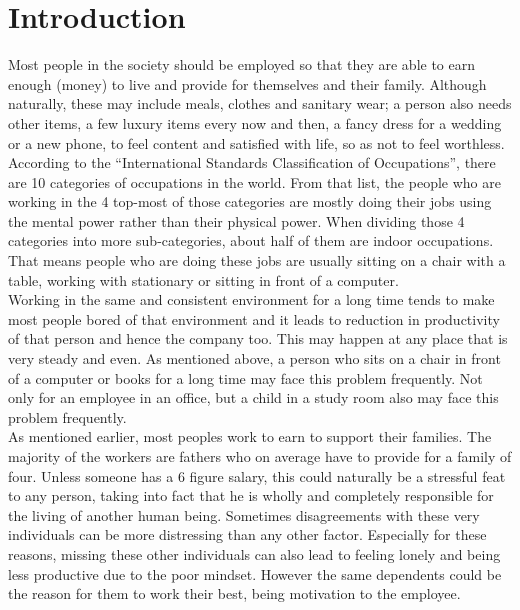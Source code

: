 \documentclass{article}
\begin{document}
	
	
	\tableofcontents
	\newpage

	\section{Introduction}
	Most people in the society should be employed so that they are able to earn enough (money) to live and provide for themselves and their family. Although naturally, these may include meals, clothes and sanitary wear; a person also needs other items, a few luxury items every now and then, a fancy dress for a wedding or a new phone, to feel content and satisfied with life, so as not to feel worthless.\\
	
	\indent According to the ``International Standards Classification of Occupations\cite{iscoDefinition}'', there are 10 categories of occupations in the world. From that list, the people who are working in the 4 top-most of those categories are mostly doing their jobs using the mental power rather than their physical power. When dividing those 4 categories into more sub-categories, about half of them are indoor occupations. That means people who are doing these jobs are usually sitting on a chair with a table, working with stationary or sitting in front of a computer.\\
	
	\indent Working in the same and consistent environment for a long time tends to make most people bored of that environment\cite{workingEnvironmentBoredom} and it leads to reduction in productivity of that person and hence the company too. This may happen at any place that is very steady and even. As mentioned above, a person who sits on a chair in front of a computer or books for a long time may face this problem frequently. Not only for an employee in an office, but a child in a study room also may face this problem frequently.\\
	
	\indent As mentioned earlier, most peoples work to earn to support their families. The majority of the workers are fathers\cite{genderDistribution} who on average have to provide for a family of four. Unless someone has a 6 figure salary, this could naturally be a stressful feat to any person, taking into fact that he is wholly and completely responsible for the living of another human being. Sometimes disagreements with these very individuals can be more distressing than any other factor. Especially for these reasons, missing these other individuals can also lead to feeling lonely and being less productive due to the poor mindset. However the same dependents could be the reason for them to work their best, being motivation to the employee.\\
	
\end{document}
